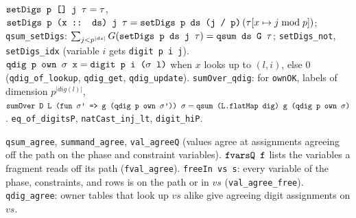 \begin{definition}
$\textnormal{\texttt{setDigs p [] j \ensuremath{\tau}}} = \tau$, $\textnormal{\texttt{setDigs p (\allowbreak{}x :: ds) j \ensuremath{\tau}}} = \textnormal{\texttt{setDigs p ds (\allowbreak{}j / p)}}\,(\tau[x\mapsto j\bmod p])$;
\textnormal{\texttt{qsum\_\allowbreak{}setDigs}}: $\sum_{j<p^{|ds|}}G(\textnormal{\texttt{setDigs p ds j \ensuremath{\tau}}}) = \textnormal{\texttt{qsum ds G \ensuremath{\tau}}}$;
\textnormal{\texttt{setDigs\_\allowbreak{}not}}, \textnormal{\texttt{setDigs\_\allowbreak{}idx}} (variable $i$ gets \textnormal{\texttt{digit p i j}}).
$\textnormal{\texttt{qdig p own \ensuremath{\sigma} x}} = \textnormal{\texttt{digit p i (\allowbreak{}\ensuremath{\sigma} l)}}$ when $x$ looks up to $(l,i)$, else $0$
(\textnormal{\texttt{qdig\_\allowbreak{}of\_\allowbreak{}lookup}}, \textnormal{\texttt{qdig\_\allowbreak{}get}}, \textnormal{\texttt{qdig\_\allowbreak{}update}}).
\textnormal{\texttt{sumOver\_\allowbreak{}qdig}}: for \textnormal{\texttt{ownOK}}, labels of dimension $p^{|\mathit{dig}(l)|}$,
$\textnormal{\texttt{sumOver D L (\allowbreak{}fun \ensuremath{\sigma}' => g (\allowbreak{}qdig p own \ensuremath{\sigma}')) \ensuremath{\sigma}}} = \textnormal{\texttt{qsum (\allowbreak{}L.\allowbreak{}flatMap dig) g (\allowbreak{}qdig p own \ensuremath{\sigma})}}$.
\textnormal{\texttt{eq\_\allowbreak{}of\_\allowbreak{}digitsP}}, \textnormal{\texttt{natCast\_\allowbreak{}inj\_\allowbreak{}lt}}, \textnormal{\texttt{digit\_\allowbreak{}hiP}}.
\end{definition}

\begin{definition}[Agreement]
\textnormal{\texttt{qsum\_\allowbreak{}agree}}, \textnormal{\texttt{summand\_\allowbreak{}agree}}, \textnormal{\texttt{val\_\allowbreak{}agreeQ}} (values agree at assignments agreeing
off the path on the phase and constraint variables). $\textnormal{\texttt{fvarsQ f}}$ lists the variables a
fragment reads off its path (\textnormal{\texttt{fval\_\allowbreak{}agree}}). \textnormal{\texttt{freeIn vs s}}: every variable of the phase,
constraints, and rows is on the path or in $vs$ (\textnormal{\texttt{val\_\allowbreak{}agree\_\allowbreak{}free}}). \textnormal{\texttt{qdig\_\allowbreak{}agree}}: owner
tables that look up $vs$ alike give agreeing digit assignments on $vs$.
\end{definition}

